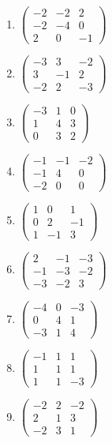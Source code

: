 \begin{enumerate}[label=\arabic*., leftmargin=*, itemsep=1pt]
\item $\left(\begin{smallmatrix}-2 & -2 & 2\\ -2 & -4 & 0\\ 2 & 0 & -1\end{smallmatrix}\right)$
\item $\left(\begin{smallmatrix}-3 & 3 & -2\\ 3 & -1 & 2\\ -2 & 2 & -3\end{smallmatrix}\right)$
\item $\left(\begin{smallmatrix}-3 & 1 & 0\\ 1 & 4 & 3\\ 0 & 3 & 2\end{smallmatrix}\right)$
\item $\left(\begin{smallmatrix}-1 & -1 & -2\\ -1 & 4 & 0\\ -2 & 0 & 0\end{smallmatrix}\right)$
\item $\left(\begin{smallmatrix}1 & 0 & 1\\ 0 & 2 & -1\\ 1 & -1 & 3\end{smallmatrix}\right)$
\item $\left(\begin{smallmatrix}2 & -1 & -3\\ -1 & -3 & -2\\ -3 & -2 & 3\end{smallmatrix}\right)$
\item $\left(\begin{smallmatrix}-4 & 0 & -3\\ 0 & 4 & 1\\ -3 & 1 & 4\end{smallmatrix}\right)$
\item $\left(\begin{smallmatrix}-1 & 1 & 1\\ 1 & 1 & 1\\ 1 & 1 & -3\end{smallmatrix}\right)$
\item $\left(\begin{smallmatrix}-2 & 2 & -2\\ 2 & 1 & 3\\ -2 & 3 & 1\end{smallmatrix}\right)$

\end{enumerate}
